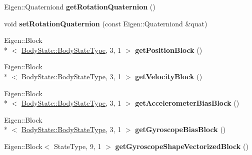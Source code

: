 \begin{DoxyCompactItemize}
\item 
\hypertarget{class_filter_state_a5f61beb08bf43811cebea645c80949ac}{Eigen\-::\-Quaterniond {\bfseries get\-Rotation\-Quaternion} ()}\label{class_filter_state_a5f61beb08bf43811cebea645c80949ac}

\item 
\hypertarget{class_filter_state_ab2a6e477d01da9521267781a73757838}{void {\bfseries set\-Rotation\-Quaternion} (const Eigen\-::\-Quaterniond \&quat)}\label{class_filter_state_ab2a6e477d01da9521267781a73757838}

\item 
\hypertarget{class_filter_state_a93091ee18e0421b6b99f6bfe039199d6}{Eigen\-::\-Block\\*
$<$ \hyperlink{class_body_state_ac95355c4974335a6f69da770d2de30e0}{Body\-State\-::\-Body\-State\-Type}, 3, 1 $>$ {\bfseries get\-Position\-Block} ()}\label{class_filter_state_a93091ee18e0421b6b99f6bfe039199d6}

\item 
\hypertarget{class_filter_state_a1b8b9f3985ea35ba0f9f4f273ae8c1f2}{Eigen\-::\-Block\\*
$<$ \hyperlink{class_body_state_ac95355c4974335a6f69da770d2de30e0}{Body\-State\-::\-Body\-State\-Type}, 3, 1 $>$ {\bfseries get\-Velocity\-Block} ()}\label{class_filter_state_a1b8b9f3985ea35ba0f9f4f273ae8c1f2}

\item 
\hypertarget{class_filter_state_a641cf74718074f9334fc88ac9d15169a}{Eigen\-::\-Block\\*
$<$ \hyperlink{class_body_state_ac95355c4974335a6f69da770d2de30e0}{Body\-State\-::\-Body\-State\-Type}, 3, 1 $>$ {\bfseries get\-Accelerometer\-Bias\-Block} ()}\label{class_filter_state_a641cf74718074f9334fc88ac9d15169a}

\item 
\hypertarget{class_filter_state_a94139185d217749e5afe23e6ad79bb12}{Eigen\-::\-Block\\*
$<$ \hyperlink{class_body_state_ac95355c4974335a6f69da770d2de30e0}{Body\-State\-::\-Body\-State\-Type}, 3, 1 $>$ {\bfseries get\-Gyroscope\-Bias\-Block} ()}\label{class_filter_state_a94139185d217749e5afe23e6ad79bb12}

\item 
\hypertarget{class_filter_state_a8686bb8e54e2e9902c28095f8c623745}{Eigen\-::\-Block$<$ State\-Type, 9, 1 $>$ {\bfseries get\-Gyroscope\-Shape\-Vectorized\-Block} ()}\label{class_filter_state_a8686bb8e54e2e9902c28095f8c623745}


\end{DoxyCompactItemize}
